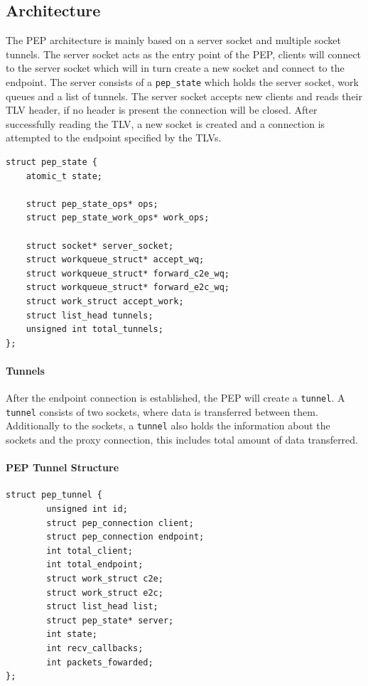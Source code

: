 \documentclass[a4paper,english, 12pt]{report}
\begin{document}
\subsection{Architecture}
The PEP architecture is mainly based on a server socket and multiple socket tunnels. The server socket acts as the entry point of the PEP, clients will connect to the server socket which will in turn create a new socket and connect to the endpoint. The server consists of a \verb|pep_state| which holds the server socket, work queues and a list of tunnels. The server socket accepts new clients and reads their TLV header, if no header is present the connection will be closed. After successfully reading the TLV, a new socket is created and a connection is attempted to the endpoint specified by the TLVs.\\

\noindent\begin{minipage}{\linewidth}
\begin{verbatim}
struct pep_state {
    atomic_t state;
    
    struct pep_state_ops* ops;
    struct pep_state_work_ops* work_ops;
    
    struct socket* server_socket;
    struct workqueue_struct* accept_wq;
    struct workqueue_struct* forward_c2e_wq;
    struct workqueue_struct* forward_e2c_wq;
    struct work_struct accept_work;
    struct list_head tunnels;
    unsigned int total_tunnels;
};
\end{verbatim}
\label{fig:pep_state_structure}
\end{minipage}

\paragraph{Tunnels}
After the endpoint connection is established, the PEP will create a \verb|tunnel|. A \verb|tunnel| consists of two sockets, where data is transferred between them. Additionally to the sockets, a \verb|tunnel| also holds the information about the sockets and the proxy connection, this includes total amount of data transferred.\\

\noindent\begin{minipage}{\linewidth}
\paragraph{PEP Tunnel Structure}
\begin{verbatim}
struct pep_tunnel {
        unsigned int id;
        struct pep_connection client;
        struct pep_connection endpoint;
        int total_client;
        int total_endpoint;
        struct work_struct c2e;
        struct work_struct e2c;
        struct list_head list;
        struct pep_state* server;
        int state;
        int recv_callbacks;
        int packets_fowarded;
};
\end{verbatim}
\end{minipage}
\end{document}
